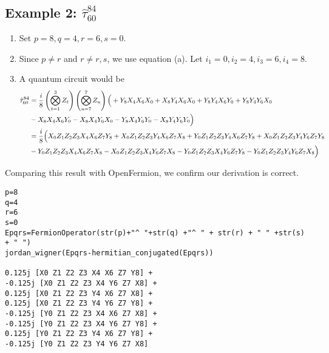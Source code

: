 \documentclass[prb,amsmath,amsfonts,amssymb]{revtex4}
\newcommand{\black}{\color{black}{}}
\begin{document}
\newpage
\subsection{Example 2: $\hat \tau_{60}^{84}$}
\begin{enumerate}
\item Set $p = 8, q=4, r = 6, s=0$.
	\item Since $p\ne r$ and $r\ne r,s$, we use equation (a). Let $i_1 = 0, i_2 = 4, i_3 = 6, i_4 = 8$.
	\item A quantum circuit would be
\begin{align}
		\hat \tau_{60}^{84} &= \frac{i}{8} \left(\bigotimes_{t=1}^{3} Z_t \right) \left(\bigotimes_{u=7}^{7} Z_u \right) 
 \Bigl(
\black +Y_8 X_4 X_6 X_0 
\black  + X_8 Y_4 X_6 X_0
\black + Y_8 Y_4 X_6  Y_0 
\black+ Y_8 Y_4 Y_6  X_0 \\&
\black - X_8 X_4 X_6 Y_0 
\black - X_8 X_4 Y_6 X_0 
\black -Y_8  X_4  Y_6 Y_0
\black- X_8 Y_4 Y_6 Y_0
\black\Bigr)\nonumber\\
&= \frac{i}{8} \Bigl(
  X_0 Z_1 Z_2 Z_3 X_4 X_6 Z_7 Y_8
+ X_0 Z_1 Z_2 Z_3 Y_4 X_6 Z_7 X_8
+ Y_0 Z_1 Z_2 Z_3 Y_4 X_6 Z_7 Y_8
+ X_0 Z_1 Z_2 Z_3 Y_4 Y_6 Z_7 Y_8\nonumber\\
&- Y_0 Z_1 Z_2 Z_3 X_4 X_6 Z_7 X_8
- X_0 Z_1 Z_2 Z_3 X_4 Y_6 Z_7 X_8
- Y_0 Z_1 Z_2 Z_3 X_4 Y_6 Z_7 Y_8
- Y_0 Z_1 Z_2 Z_3 Y_4 Y_6 Z_7 X_8
\Bigr)
\end{align}
\end{enumerate}

Comparing this result with OpenFermion, we confirm our derivation is correct.
\begin{Verbatim}[frame=single, xleftmargin=4mm, xrightmargin=10mm]
p=8
q=4 
r=6
s=0 
Epqrs=FermionOperator(str(p)+"^ "+str(q) +"^ " + str(r) + " " +str(s) + " ") 
jordan_wigner(Epqrs-hermitian_conjugated(Epqrs))

0.125j [X0 Z1 Z2 Z3 X4 X6 Z7 Y8] +
-0.125j [X0 Z1 Z2 Z3 X4 Y6 Z7 X8] +
0.125j [X0 Z1 Z2 Z3 Y4 X6 Z7 X8] +
0.125j [X0 Z1 Z2 Z3 Y4 Y6 Z7 Y8] +
-0.125j [Y0 Z1 Z2 Z3 X4 X6 Z7 X8] +
-0.125j [Y0 Z1 Z2 Z3 X4 Y6 Z7 Y8] +
0.125j [Y0 Z1 Z2 Z3 Y4 X6 Z7 Y8] +
-0.125j [Y0 Z1 Z2 Z3 Y4 Y6 Z7 X8]
\end{Verbatim}

\newpage
\end{document}
